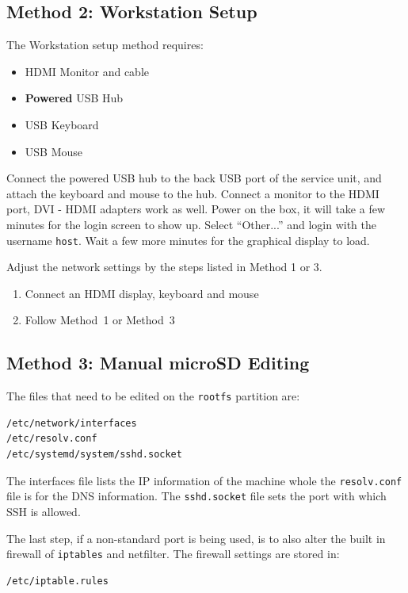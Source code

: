 \subsection*{Method 2: Workstation Setup}
The Workstation setup method requires:
\begin{itemize}
\item{HDMI Monitor and cable}
\item{{\bf Powered} USB Hub}
\item{USB Keyboard}
\item{USB Mouse}
\end{itemize}

Connect the powered USB hub to the back USB port of the service unit, and attach the keyboard and mouse to the hub.
Connect a monitor to the HDMI port, DVI - HDMI adapters work as well.
Power on the box, it will take a few minutes for the login screen to show up.
Select ``Other...'' and login with the username \texttt{host}.
Wait a few more minutes for the graphical display to load.

Adjust the network settings by the steps listed in Method 1 or 3.

\begin{enumerate}
\item{Connect an HDMI display, keyboard and mouse}
\item{Follow Method~1 or Method~3}
\end{enumerate}


\subsection*{Method 3: Manual microSD Editing}

The files that need to be edited on the \texttt{rootfs} partition are:

\begin{verbatim}
/etc/network/interfaces
/etc/resolv.conf
/etc/systemd/system/sshd.socket
\end{verbatim}

The interfaces file lists the IP information of the machine whole the \texttt{resolv.conf} file is for the DNS information.
The \texttt{sshd.socket} file sets the port with which SSH is allowed.

The last step, if a non-standard port is being used, is to also alter the built in firewall of \texttt{iptables} and netfilter.
The firewall settings are stored in:

\begin{verbatim}
/etc/iptable.rules
\end{verbatim}

